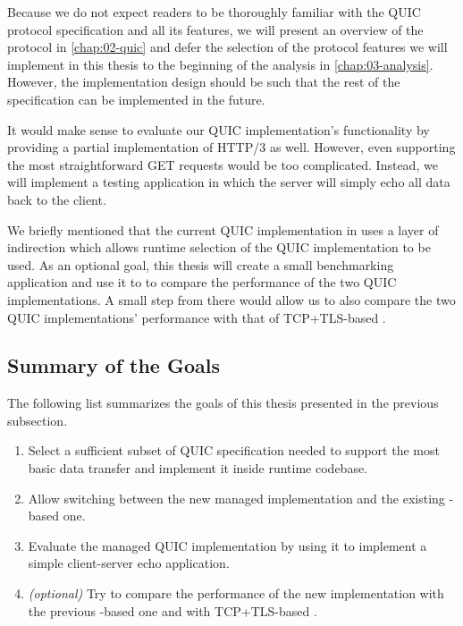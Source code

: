 Because we do not expect readers to be thoroughly familiar with the QUIC protocol specification and
all its features, we will present an overview of the protocol in \autoref{chap:02-quic} and defer
the selection of the protocol features we will implement in this thesis to the beginning of the
analysis in \autoref{chap:03-analysis}. However, the implementation design should be such that the
rest of the specification can be implemented in the future.

It would make sense to evaluate our QUIC implementation's functionality by providing a partial
implementation of HTTP/3 as well. However, even supporting the most straightforward GET requests
would be too complicated. Instead, we will implement a testing application in which the server will
simply echo all data back to the client.

We briefly mentioned that the current QUIC implementation in \dotnet{} uses a layer of indirection
which allows runtime selection of the QUIC implementation to be used. As an optional goal, this
thesis will create a small benchmarking application and use it to to compare the performance of the
two QUIC implementations. A small step from there would allow us to also compare the two QUIC
implementations' performance with that of TCP+TLS-based .

\subsection*{Summary of the Goals}

The following list summarizes the goals of this thesis presented in the previous subsection.

\begin{enumerate}

  \item Select a sufficient subset of QUIC specification needed to support the most basic data
transfer and implement it inside \dotnet{} runtime codebase.

  \item Allow switching between the new managed implementation and the existing \libmsquic{}-based
one.

  \item Evaluate the managed QUIC implementation by using it to implement a simple client-server
echo application.

  \item \textit{(optional)} Try to compare the performance of the new implementation with the
previous \libmsquic{}-based one and with TCP+TLS-based .

\end{enumerate}
